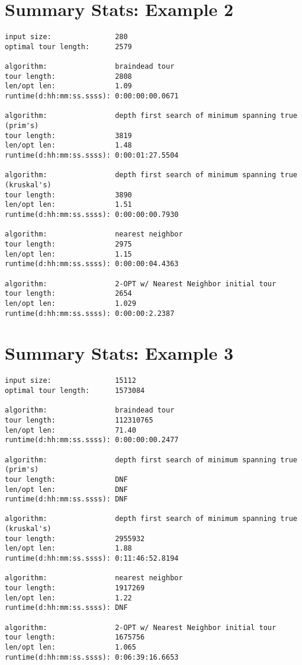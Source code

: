 \documentclass[12pt]{article}
\begin{document}
\newpage
\section*{Summary Stats: Example 2}
\begin{verbatim}
input size:               280
optimal tour length:      2579

algorithm:                braindead tour
tour length:              2808
len/opt len:              1.09
runtime(d:hh:mm:ss.ssss): 0:00:00:00.0671

algorithm:                depth first search of minimum spanning true (prim's) 
tour length:              3819
len/opt len:              1.48
runtime(d:hh:mm:ss.ssss): 0:00:01:27.5504

algorithm:                depth first search of minimum spanning true (kruskal's) 
tour length:              3890
len/opt len:              1.51
runtime(d:hh:mm:ss.ssss): 0:00:00:00.7930

algorithm:                nearest neighbor 
tour length:              2975
len/opt len:              1.15
runtime(d:hh:mm:ss.ssss): 0:00:00:04.4363

algorithm:                2-OPT w/ Nearest Neighbor initial tour
tour length:              2654
len/opt len:              1.029
runtime(d:hh:mm:ss.ssss): 0:00:00:2.2387
\end{verbatim}

\newpage
\section*{Summary Stats: Example 3}
\begin{verbatim}
input size:               15112
optimal tour length:      1573084

algorithm:                braindead tour
tour length:              112310765
len/opt len:              71.40
runtime(d:hh:mm:ss.ssss): 0:00:00:00.2477

algorithm:                depth first search of minimum spanning true (prim's) 
tour length:              DNF
len/opt len:              DNF
runtime(d:hh:mm:ss.ssss): DNF

algorithm:                depth first search of minimum spanning true (kruskal's) 
tour length:              2955932
len/opt len:              1.88
runtime(d:hh:mm:ss.ssss): 0:11:46:52.8194

algorithm:                nearest neighbor 
tour length:              1917269
len/opt len:              1.22
runtime(d:hh:mm:ss.ssss): DNF

algorithm:                2-OPT w/ Nearest Neighbor initial tour
tour length:              1675756
len/opt len:              1.065
runtime(d:hh:mm:ss.ssss): 0:06:39:16.6653
\end{verbatim}
\end{document}
